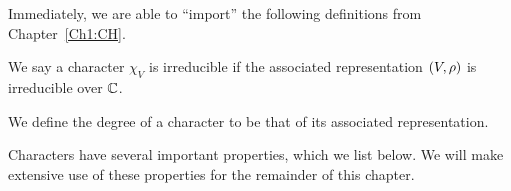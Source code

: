 Immediately, we are able to ``import'' the following definitions from Chapter~\ref{Ch1:CH}.

\begin{definition}[Irreducibility]
    We say a character $\chi_V$ is irreducible if the associated representation $\left( V, \rho \right)$ is irreducible over $\mathbb{C}$.
\end{definition}

\begin{definition}[Degree]
    We define the degree of a character to be that of its associated representation.
\end{definition}


Characters have several important properties, which we list below. We will make extensive use of these properties for the remainder of this chapter.

